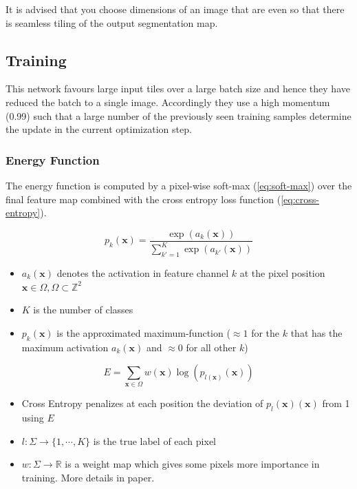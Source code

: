 \documentclass[11pt]{article}
\begin{document}
It is advised that you choose dimensions of an image that are even so that there is seamless tiling of the output segmentation map.

\subsection{Training}

This network favours large input tiles over a large batch size and hence they have reduced the batch to a single image. Accordingly they use a high momentum (0.99) such that a large number of the previously seen training samples determine the update in the current optimization step.

\subsubsection{Energy Function}

The energy function is computed by a pixel-wise soft-max (\ref{eq:soft-max}) over the final feature map combined with the cross entropy loss function (\ref{eq:cross-entropy}). 

\begin{equation}
    p_k(\textbf{x}) = \frac{\exp(a_k(\textbf{x}))}{\sum^K_{k'=1}\exp(a_{k'}(\textbf{x}))} \label{eq:soft-max}
\end{equation}

\begin{itemize}
    \item $a_k(\textbf{x})$ denotes the activation in feature channel $k$ at the pixel position $\textbf{x} \in \Omega, \Omega \subset \mathbb{Z}^2$
    \item $K$ is the number of classes
    \item $p_k(\textbf{x})$ is the approximated maximum-function ($\approx 1$ for the $k$ that has the maximum activation $a_k(\textbf{x})$ and $\approx 0$ for all other $k$)
\end{itemize}

\begin{equation}
    E = \sum_{\textbf{x} \in \Omega} w(\textbf{x})\log(p_{l(\textbf{x})}(\textbf{x})) \label{eq:cross-entropy}
\end{equation}

\begin{itemize}
    \item Cross Entropy penalizes at each position the deviation of $p_l(\textbf{x})(\textbf{x})$ from 1 using $E$
    \item $l : \Sigma \rightarrow \{1, \cdots, K \}$ is the true label of each pixel
    \item $w : \Sigma \rightarrow \mathbb R$ is a weight map which gives some pixels more importance in training. More details in paper.
\end{itemize}
\end{document}
